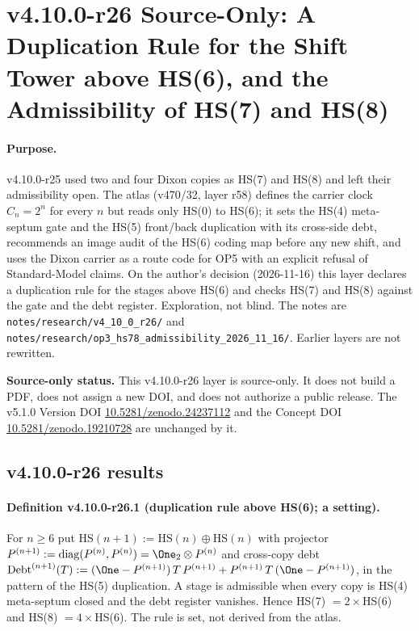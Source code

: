 
\clearpage
\section*{v4.10.0-r26 Source-Only: A Duplication Rule for the Shift Tower above HS(6), and the Admissibility of HS(7) and HS(8)}
\label{sec:v4100-r26-hs-duplication}

\paragraph{Purpose.}
v4.10.0-r25 used two and four Dixon copies as HS(7) and HS(8) and left their admissibility open.  The atlas (v470/32, layer r58) defines
the carrier clock \(C_n=2^n\) for every \(n\) but reads only HS(0) to HS(6); it sets the HS(4) meta-septum gate and the HS(5) front/back
duplication with its cross-side debt, recommends an image audit of the HS(6) coding map before any new shift, and uses the Dixon carrier
as a route code for OP5 with an explicit refusal of Standard-Model claims.  On the author's decision (2026-11-16) this layer declares a
duplication rule for the stages above HS(6) and checks HS(7) and HS(8) against the gate and the debt register.  Exploration, not blind.
The notes are \texttt{notes/\allowbreak research/\allowbreak v4\_10\_0\_r26/} and
\texttt{notes/\allowbreak research/\allowbreak op3\_hs78\_admissibility\_2026\_11\_16/}.  Earlier layers are not rewritten.

\noindent\textbf{Source-only status.}
This v4.10.0-r26 layer is source-only.  It does not build a PDF, does not assign a new DOI,
and does not authorize a public release.  The v5.1.0 Version DOI
\href{https://doi.org/10.5281/zenodo.24237112}{10.5281/zenodo.24237112} and the Concept DOI
\href{https://doi.org/10.5281/zenodo.19210728}{10.5281/zenodo.19210728} are unchanged by it.

\subsection*{v4.10.0-r26 results}
\label{subsec:v4100-r26-results}

\paragraph{Definition v4.10.0-r26.1 (duplication rule above HS(6); a setting).}
For \(n\ge6\) put \(\mathrm{HS}(n+1):=\mathrm{HS}(n)\oplus\mathrm{HS}(n)\) with projector \(P^{(n+1)}:=\mathrm{diag}(P^{(n)},P^{(n)})=\One_2\otimes P^{(n)}\) and cross-copy
debt \(\mathrm{Debt}^{(n+1)}(T):=(\One-P^{(n+1)})\,T\,P^{(n+1)}+P^{(n+1)}\,T\,(\One-P^{(n+1)})\), in the pattern of the HS(5) duplication.  A stage is
admissible when every copy is HS(4) meta-septum closed and the debt register vanishes.  Hence HS(7) \(=2\times\)HS(6) and HS(8) \(=4\times\)HS(6).
The rule is set, not derived from the atlas.

